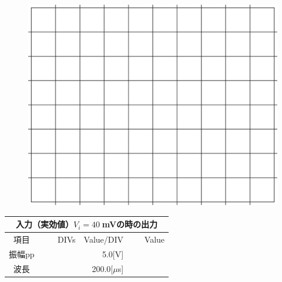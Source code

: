 \documentclass[uplatex,a4paper,11pt,oneside,openany]{jsbook}
\begin{document}
\begin{multicols}{2}
  \begin{figure}[H]
     \centering
      \includegraphics[keepaspectratio, scale=0.28, angle=0]
                  {figs/eps/grid.eps}
                  \label{fig:grid40mV}
  \end{figure}

  \begin{spacing}{1.5}
  \begin{tabular}{|c||r|r|r|}
    \multicolumn{4}{c}{入力（実効値）$V_i=40\;$mVの時の出力} \\ \hline
    項目 & DIVs & Value/DIV & Value \\ \hline \hline
    振幅pp & 　　　　 & 5.0[V]& 　　　　 \\ \hline
    波長 & 　　　　 & 200.0[$\mu$s]& 　　　　 \\ \hline
  \end{tabular}
\end{spacing}
\end{multicols}

\vfill
\end{document}
